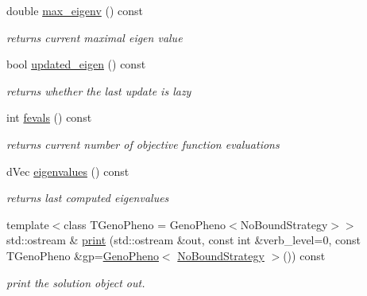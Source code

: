 \begin{DoxyCompactItemize}
double \hyperlink{classlibcmaes_1_1CMASolutions_a600c62ab2769f9eab18951c49846e003}{max\-\_\-eigenv} () const 
\begin{DoxyCompactList}\small\item\em returns current maximal eigen value \end{DoxyCompactList}\item 
bool \hyperlink{classlibcmaes_1_1CMASolutions_a82171a1285713a228bce32c923fc65fd}{updated\-\_\-eigen} () const 
\begin{DoxyCompactList}\small\item\em returns whether the last update is lazy \end{DoxyCompactList}\item 
int \hyperlink{classlibcmaes_1_1CMASolutions_a8b19ae50312e62c7feb810e8ff0d9dfd}{fevals} () const 
\begin{DoxyCompactList}\small\item\em returns current number of objective function evaluations \end{DoxyCompactList}\item 
d\-Vec \hyperlink{classlibcmaes_1_1CMASolutions_add38348a9496b9559e72a020b952a262}{eigenvalues} () const 
\begin{DoxyCompactList}\small\item\em returns last computed eigenvalues \end{DoxyCompactList}\item 
{\footnotesize template$<$class T\-Geno\-Pheno  = Geno\-Pheno$<$\-No\-Bound\-Strategy$>$$>$ }\\std\-::ostream \& \hyperlink{classlibcmaes_1_1CMASolutions_ae07d8d902185611f8b14533c425ab6e4}{print} (std\-::ostream \&out, const int \&verb\-\_\-level=0, const T\-Geno\-Pheno \&gp=\hyperlink{classlibcmaes_1_1GenoPheno}{Geno\-Pheno}$<$ \hyperlink{classlibcmaes_1_1NoBoundStrategy}{No\-Bound\-Strategy} $>$()) const 
\begin{DoxyCompactList}\small\item\em print the solution object out. \end{DoxyCompactList}\end{DoxyCompactItemize}
